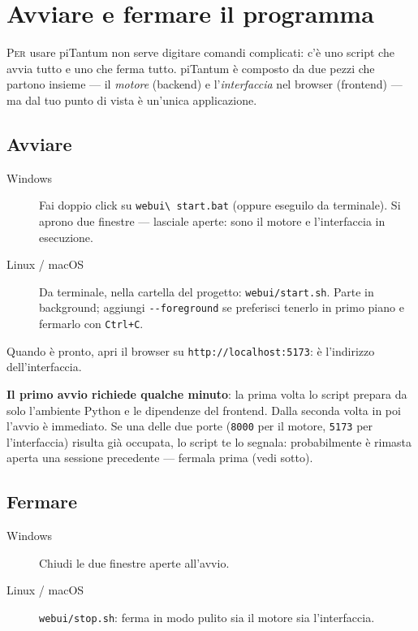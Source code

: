 \chapter{Avviare e fermare il programma}
\label{ch:launcher}

\lettrine[lines=3]{P}{er} usare piTantum non serve digitare comandi
complicati: c'\`e uno script che avvia tutto e uno che ferma tutto.
piTantum \`e composto da due pezzi che partono insieme --- il
\emph{motore} (backend) e l'\emph{interfaccia} nel browser
(frontend) --- ma dal tuo punto di vista \`e un'unica applicazione.

\section{Avviare}

\begin{description}
\item[Windows] Fai doppio click su \texttt{webui\textbackslash
start.bat} (oppure eseguilo da terminale). Si aprono due finestre
--- lasciale aperte: sono il motore e l'interfaccia in esecuzione.
\item[Linux / macOS] Da terminale, nella cartella del progetto:
\texttt{webui/start.sh}. Parte in background; aggiungi
\texttt{-{}-foreground} se preferisci tenerlo in primo piano e
fermarlo con \texttt{Ctrl+C}.
\end{description}

Quando \`e pronto, apri il browser su \texttt{http://localhost:5173}:
\`e l'indirizzo dell'interfaccia.

\begin{avvertenzabox}
\textbf{Il primo avvio richiede qualche minuto}: la prima volta lo
script prepara da solo l'ambiente Python e le dipendenze del
frontend. Dalla seconda volta in poi l'avvio \`e immediato. Se una
delle due porte (\texttt{8000} per il motore, \texttt{5173} per
l'interfaccia) risulta gi\`a occupata, lo script te lo segnala:
probabilmente \`e rimasta aperta una sessione precedente ---
fermala prima (vedi sotto).
\end{avvertenzabox}

\section{Fermare}

\begin{description}
\item[Windows] Chiudi le due finestre aperte all'avvio.
\item[Linux / macOS] \texttt{webui/stop.sh}: ferma in modo pulito
sia il motore sia l'interfaccia.
\end{description}

